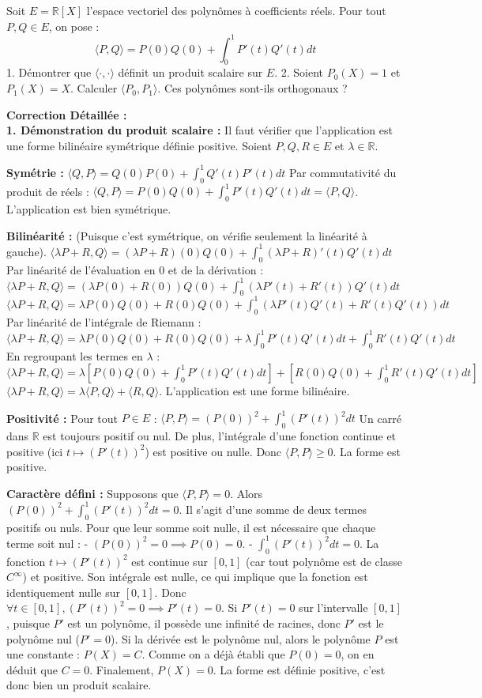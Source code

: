 \documentclass[11pt,a4paper]{report}
\begin{document}
Soit $E = \mathbb{R}[X]$ l'espace vectoriel des polynômes à coefficients réels.
Pour tout $P, Q \in E$, on pose :
$$\langle P, Q \rangle = P(0)Q(0) + \int_0^1 P'(t)Q'(t) dt$$
1. Démontrer que $\langle \cdot, \cdot \rangle$ définit un produit scalaire sur $E$.
2. Soient $P_0(X) = 1$ et $P_1(X) = X$. Calculer $\langle P_0, P_1 \rangle$. Ces polynômes sont-ils orthogonaux ?

\textbf{Correction Détaillée :}\\ \textbf{1. Démonstration du produit scalaire :}
Il faut vérifier que l'application est une forme bilinéaire symétrique définie positive.
Soient $P, Q, R \in E$ et $\lambda \in \mathbb{R}$.

\textbf{Symétrie :}
$\langle Q, P \rangle = Q(0)P(0) + \int_0^1 Q'(t)P'(t) dt$
Par commutativité du produit de réels :
$\langle Q, P \rangle = P(0)Q(0) + \int_0^1 P'(t)Q'(t) dt = \langle P, Q \rangle$.
L'application est bien symétrique.

\textbf{Bilinéarité :}
(Puisque c'est symétrique, on vérifie seulement la linéarité à gauche).
$\langle \lambda P + R, Q \rangle = (\lambda P + R)(0)Q(0) + \int_0^1 (\lambda P + R)'(t)Q'(t) dt$
Par linéarité de l'évaluation en 0 et de la dérivation :
$\langle \lambda P + R, Q \rangle = (\lambda P(0) + R(0))Q(0) + \int_0^1 (\lambda P'(t) + R'(t))Q'(t) dt$
$\langle \lambda P + R, Q \rangle = \lambda P(0)Q(0) + R(0)Q(0) + \int_0^1 (\lambda P'(t)Q'(t) + R'(t)Q'(t)) dt$
Par linéarité de l'intégrale de Riemann :
$\langle \lambda P + R, Q \rangle = \lambda P(0)Q(0) + R(0)Q(0) + \lambda \int_0^1 P'(t)Q'(t) dt + \int_0^1 R'(t)Q'(t) dt$
En regroupant les termes en $\lambda$ :
$\langle \lambda P + R, Q \rangle = \lambda \left[ P(0)Q(0) + \int_0^1 P'(t)Q'(t) dt \right] + \left[ R(0)Q(0) + \int_0^1 R'(t)Q'(t) dt \right]$
$\langle \lambda P + R, Q \rangle = \lambda \langle P, Q \rangle + \langle R, Q \rangle$.
L'application est une forme bilinéaire.

\textbf{Positivité :}
Pour tout $P \in E$ :
$\langle P, P \rangle = (P(0))^2 + \int_0^1 (P'(t))^2 dt$
Un carré dans $\mathbb{R}$ est toujours positif ou nul. De plus, l'intégrale d'une fonction continue et positive (ici $t \mapsto (P'(t))^2$) est positive ou nulle.
Donc $\langle P, P \rangle \ge 0$. La forme est positive.

\textbf{Caractère défini :}
Supposons que $\langle P, P \rangle = 0$.
Alors $(P(0))^2 + \int_0^1 (P'(t))^2 dt = 0$.
Il s'agit d'une somme de deux termes positifs ou nuls. Pour que leur somme soit nulle, il est nécessaire que chaque terme soit nul :
- $(P(0))^2 = 0 \implies P(0) = 0$.
- $\int_0^1 (P'(t))^2 dt = 0$.
La fonction $t \mapsto (P'(t))^2$ est continue sur $[0,1]$ (car tout polynôme est de classe $C^\infty$) et positive. Son intégrale est nulle, ce qui implique que la fonction est identiquement nulle sur $[0,1]$.
Donc $\forall t \in [0, 1], (P'(t))^2 = 0 \implies P'(t) = 0$.
Si $P'(t) = 0$ sur l'intervalle $[0, 1]$, puisque $P'$ est un polynôme, il possède une infinité de racines, donc $P'$ est le polynôme nul ($P' = 0$).
Si la dérivée est le polynôme nul, alors le polynôme $P$ est une constante : $P(X) = C$.
Comme on a déjà établi que $P(0) = 0$, on en déduit que $C = 0$.
Finalement, $P(X) = 0$.
La forme est définie positive, c'est donc bien un produit scalaire.
\end{document}
